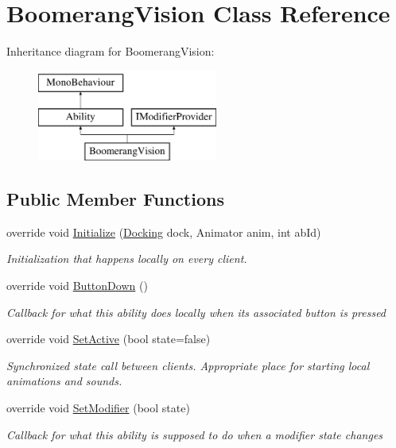 \hypertarget{class_boomerang_vision}{}\section{Boomerang\+Vision Class Reference}
\label{class_boomerang_vision}
Inheritance diagram for Boomerang\+Vision\+:\begin{figure}[H]
\begin{center}
\leavevmode
\includegraphics[height=3.000000cm]{class_boomerang_vision}
\end{center}
\end{figure}
\subsection*{Public Member Functions}
\begin{DoxyCompactItemize}
\item 
override void \hyperlink{class_boomerang_vision_ab7ad2e1f439267cfdb0aeedcc749c06e}{Initialize} (\hyperlink{class_docking}{Docking} dock, Animator anim, int ab\+Id)
\begin{DoxyCompactList}\small\item\em Initialization that happens locally on every client. \end{DoxyCompactList}\item 
override void \hyperlink{class_boomerang_vision_ad267dac2d41e6069e922cf35cd3a0814}{Button\+Down} ()
\begin{DoxyCompactList}\small\item\em Callback for what this ability does locally when its associated button is pressed \end{DoxyCompactList}\item 
override void \hyperlink{class_boomerang_vision_a57466383cc537a290ddc4e4fcf7a4c35}{Set\+Active} (bool state=false)
\begin{DoxyCompactList}\small\item\em Synchronized state call between clients. Appropriate place for starting local animations and sounds. \end{DoxyCompactList}\item 
override void \hyperlink{class_boomerang_vision_a3fff30008efe643eeee867fad5c68b06}{Set\+Modifier} (bool state)
\begin{DoxyCompactList}\small\item\em Callback for what this ability is supposed to do when a modifier state changes \end{DoxyCompactList}\end{DoxyCompactItemize}
